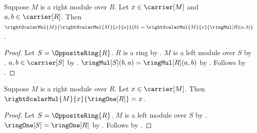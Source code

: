 \begin{proposition}\label{right_scalar_associative}
    Suppose $M$ is a right module over $R$.
    Let $x\in\carrier[M]$ and $a,b\in\carrier[R]$.
    Then
        $\rightScalarMul{M}{\rightScalarMul{M}{x}{a}}{b}
            =\rightScalarMul{M}{x}{\ringMul[R](a,b)}$.
\end{proposition}
\begin{proof}
    Let $S=\OppositeRing{R}$.
    $R$ is a ring by .
    $M$ is a left module over $S$ by
        .
    $a,b\in\carrier[S]$ by .
    $\ringMul[S](b,a)=\ringMul[R](a,b)$ by
        .
    Follows by
        .
\end{proof}

\begin{proposition}\label{right_scalar_one}
    Suppose $M$ is a right module over $R$.
    Let $x\in\carrier[M]$.
    Then $\rightScalarMul{M}{x}{\ringOne[R]}=x$.
\end{proposition}
\begin{proof}
    Let $S=\OppositeRing{R}$.
    $M$ is a left module over $S$ by
        .
    $\ringOne[S]=\ringOne[R]$ by
        .
    Follows by
        .
\end{proof}
